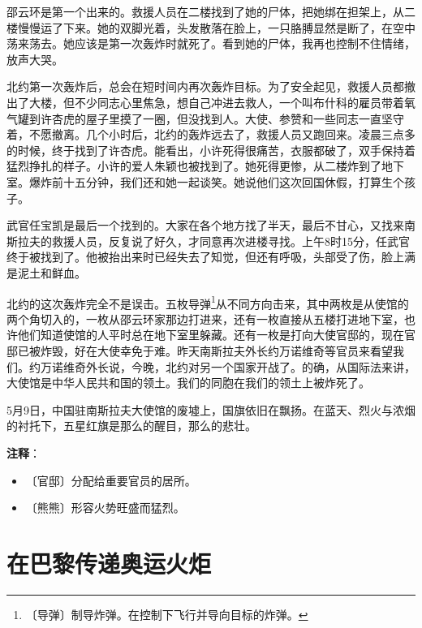 \documentclass[12pt,UTF-8,openany]{ctexbook}
\begin{document}
\begin{large}
    邵云环是第一个出来的。救援人员在二楼找到了她的尸体，把她绑在担架上，从二楼慢慢运了下来。她的双脚光着，头发散落在脸上，一只胳膊显然是断了，在空中荡来荡去。她应该是第一次轰炸时就死了。看到她的尸体，我再也控制不住情绪，放声大哭。
    
    北约第一次轰炸后，总会在短时间内再次轰炸目标。为了安全起见，救援人员都撤出了大楼，但不少同志心里焦急，想自己冲进去救人，一个叫布什科的雇员带着氧气罐到许杏虎的屋子里摸了一圈，但没找到人。大使、参赞和一些同志一直坚守着，不愿撤离。几个小时后，北约的轰炸远去了，救援人员又跑回来。凌晨三点多的时候，终于找到了许杏虎。能看出，小许死得很痛苦，衣服都破了，双手保持着猛烈挣扎的样子。小许的爱人朱颖也被找到了。她死得更惨，从二楼炸到了地下室。爆炸前十五分钟，我们还和她一起谈笑。她说他们这次回国休假，打算生个孩子。
    
    武官任宝凯是最后一个找到的。大家在各个地方找了半天，最后不甘心，又找来南斯拉夫的救援人员，反复说了好久，才同意再次进楼寻找。上午8时15分，任武官终于被找到了。他被抬出来时已经失去了知觉，但还有呼吸，头部受了伤，脸上满是泥土和鲜血。
    
    北约的这次轰炸完全不是误击。五枚导弹\footnote{〔导弹〕制导炸弹。在控制下飞行并导向目标的炸弹。}从不同方向击来，其中两枚是从使馆的两个角切入的，一枚从邵云环家那边打进来，还有一枚直接从五楼打进地下室，也许他们知道使馆的人平时总在地下室里躲藏。还有一枚是打向大使官邸的，现在官邸已被炸毁，好在大使幸免于难。昨天南斯拉夫外长约万诺维奇等官员来看望我们。约万诺维奇外长说，今晚，北约对另一个国家开战了。的确，从国际法来讲，大使馆是中华人民共和国的领土。我们的同胞在我们的领土上被炸死了。
    
    5月9日，中国驻南斯拉夫大使馆的废墟上，国旗依旧在飘扬。在蓝天、烈火与浓烟的衬托下，五星红旗是那么的醒目，那么的悲壮。
    
\end{large}


\newpage

\textbf{注释}：

\vspace{-1em}

\begin{itemize}
    \setlength\itemsep{-0.2em}
    \item 〔官邸〕分配给重要官员的居所。
    \item 〔熊熊〕形容火势旺盛而猛烈。
\end{itemize}

\chapter{在巴黎传递奥运火炬}
\end{document}
